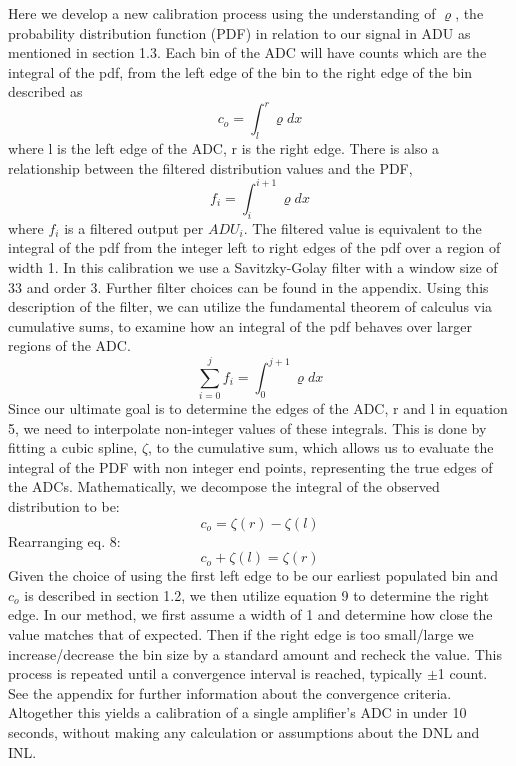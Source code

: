 \documentclass[11pt, letterpaper]{article}
\begin{document}
Here we develop a new calibration process using the understanding of $\varrho$, the probability distribution function (PDF) in relation to our signal in ADU as mentioned in section 1.3. 
Each bin of the ADC will have counts which are the integral of the pdf, from the left edge of the bin to the right edge of the bin described as
 \begin{equation}
c_o =  \int_{l}^{r} \varrho dx
\end{equation}
where l is the left edge of the ADC, r is the right edge. 
There is also a relationship between the filtered distribution values and the PDF,
 \begin{equation}
f_i =  \int_{i}^{i+1} \varrho dx
\end{equation}
where $f_{i}$ is a filtered output per $ADU_{i}$. 
The filtered value is equivalent to the integral of the pdf from the integer left to right edges of the pdf over a region of width 1. 
In this calibration we use a Savitzky-Golay filter with a window size of 33 and order 3. 
Further filter choices can be found in the appendix. 
Using this description of the filter, we can utilize the fundamental theorem of calculus via cumulative sums, to examine how an integral of the pdf behaves over larger regions of the ADC. 
 \begin{equation}
\sum_{i=0}^{j} f_i= \int_{0}^{j+1} \varrho dx
\end{equation}
Since our ultimate goal is to determine the edges of the ADC, r and l in equation 5, we need to interpolate non-integer values of these integrals. 
This is done by fitting a cubic spline, $ \zeta$, to the cumulative sum, which allows us to evaluate the integral of the PDF with non integer end points, representing the true edges of the ADCs. 
Mathematically, we decompose the integral of the observed distribution to be:
 \begin{equation}
c_o = \zeta(r) - \zeta(l)
\end{equation}
Rearranging eq. 8: 
 \begin{equation}
c_o + \zeta(l) = \zeta(r)
\end{equation}
Given the choice of using the first left edge to be our earliest populated bin and $c_{o}$ is described in section 1.2, we then utilize equation 9 to determine the right edge.
In our method, we first assume a width of 1 and determine how close the value matches that of expected. Then if the right edge is too small/large we increase/decrease the bin size by a standard amount and recheck the value. 
This process is repeated until a convergence interval is reached, typically $\pm$1 count. 
See the appendix for further information about the convergence criteria. 
Altogether this yields a calibration of a single amplifier's ADC in under 10 seconds, without making any calculation or assumptions about the DNL and INL.
\end{document}
